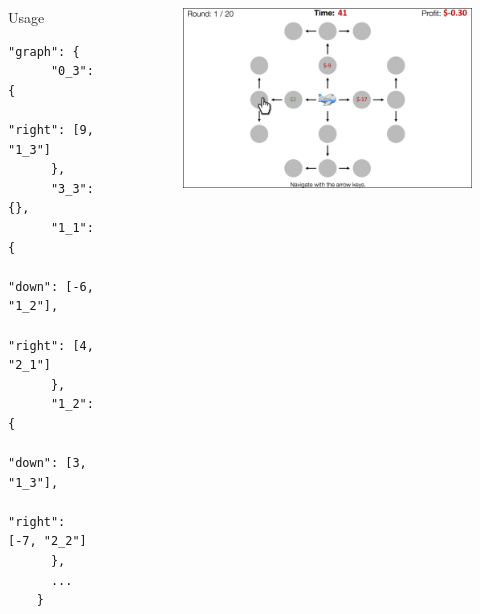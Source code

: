 \documentclass[final]{beamer}
\newlength{\sepwid}
\newlength{\onecolwid}
\newlength{\twocolwid}
\begin{document}
\begin{frame}[t, fragile]
\begin{columns}[t]
\begin{column}{\onecolwid}
  \begin{block}{Usage}\label{usage}
    \begin{Verbatim}[fontsize=\small]
    "graph": {
      "0_3": {
        "right": [9, "1_3"]
      },
      "3_3": {},
      "1_1": {
        "down": [-6, "1_2"],
        "right": [4, "2_1"]
      },
      "1_2": {
        "down": [3, "1_3"],
        "right": [-7, "2_2"]
      },
      ...
    }
    \end{Verbatim}
  \end{block}

\end{column} %

\begin{column}{\sepwid}\end{column} %
\begin{column}{\twocolwid} %

  \begin{figure}
    \includegraphics[width=0.9\linewidth]{figs/paradigm_illustration1.png}
  \end{figure}


  \begin{columns}[t,totalwidth=\twocolwid] %
    
    \begin{column}{\onecolwid} %
      

\end{column}
\end{columns}
\end{column}
\end{columns}
\end{frame}
\end{document}
